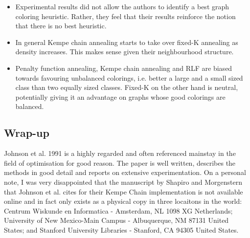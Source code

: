 \begin{itemize}
	\item Experimental results did not allow the authors to identify a best graph coloring heuristic. Rather, they feel that their results reinforce the notion that there is no best heuristic.
	\item In general Kempe chain annealing starts to take over fixed-K annealing as density increases. This makes sense given their neighbourhood structure.
	\item Penalty function annealing, Kempe chain annealing and RLF are biased towards favouring unbalanced colorings, i.e. better a large and a small sized class than two equally sized classes. Fixed-K on the other hand is neutral, potentially giving it an advantage on graphs whose good colorings are balanced.
	\end{itemize}


\subsection{Wrap-up}

Johnson et al. 1991 is a highly regarded and often referenced mainstay in the field of optimisation for good reason. The paper is well written, describes the methods in good detail and reports on extensive experimentation. 
On a personal note, I was very disappointed that the manuscript by Shapiro and Morgenstern that Johnson et al. cites for their Kempe Chain implementation is not available online and in fact only exists as a physical copy in three locaitons in the world: Centrum Wiskunde en Informatica - Amsterdam, NL 1098 XG Netherlands; University of New Mexico-Main Campus - Albuquerque, NM 87131 United States; and Stanford University Libraries - Stanford, CA 94305 United States.


